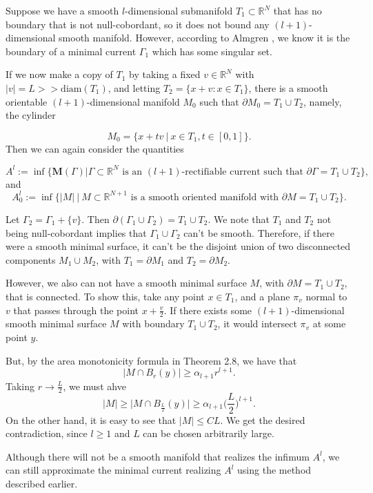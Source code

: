 \documentclass{amsart}
\numberwithin{equation}{section}
\theoremstyle{definition}
\theoremstyle{remark}
\newcommand{\R}{\mathbb{R}}
\begin{document}
Suppose we have a smooth $l$-dimensional submanifold $T_1\subset\R^N$ that has no boundary that is not null-cobordant, so it does not bound any $(l+1)$-dimensional smooth manifold. However, according to Almgren \cite{Almgren}, we know it 
{is} the boundary of a minimal current $\Gamma_1$ which has some singular set.

If we now make a copy of $T_1$ by taking a fixed $v \in \mathbb{R}^N$ with $|v| = L >> \text{diam}(T_1)$, and letting $T_2 = \{ x + v: x \in T_1 \}$, there  is a smooth orientable $(l+1)$-dimensional manifold $M_0$ such that $\partial M_0 = T_1 \cup T_2$, namely, the cylinder

\[ M_0 = \big\{ x+ tv\ \big|\  x \in T_1, t \in [0,1] \big\} .\]
Then we can again consider the quantities

\[ A^l := \inf \Big\{ \mathbf{M}(\Gamma)\big|\Gamma\subset\R^N \text{ is an } (l+1)\text{-rectifiable current such that } \partial \Gamma = T_1 \cup T_2 \Big\},\]
and
\[ A^l_0 := \inf \Big\{ |M|\ \big|\ M\subset\R^{N+1} \text{ is a } \text{smooth oriented manifold with } \partial M = T_1 \cup T_2 \Big\} .\]

Let $\Gamma_2 = \Gamma_1 + \{v\}$. Then $\partial (\Gamma_1 \cup \Gamma_2) = T_1 \cup T_2$. We note that $T_1$ and $T_2$ not being null-cobordant implies that $\Gamma_1 \cup \Gamma_2$ can't be smooth. Therefore, if there were a smooth minimal surface, it can't be the disjoint union of two disconnected components $M_1 \cup M_2$, with $T_1 = \partial M_1$ and $T_2 = \partial M_2$.

However, we also can not have a smooth minimal surface $M$, with $\partial M = T_1\cup T_2$,  that is connected. To show this, take any point $x \in T_1$, and a plane $\pi_v$ normal to $v$ that passes through the point $x +\frac{v}{2}$. If there exists some $(l+1)$-dimensional smooth minimal surface $M$ with boundary $T_1 \cup T_2$, it would intersect $\pi_v$ at some point $y $.

But, {by the area monotonicity formula in Theorem 2.8}, we have that
\[\big|M \cap B_r(y)\big| \geq \alpha_{l+1} r^{l+1}.\]
Taking $r \to \frac{L}2$, we must ahve
$$\big|M\big|\ge\big|M \cap B_{\frac{L}2}(y)\big|
\ge \alpha_{l+1} \big(\frac{L}{2}\big)^{l+1}.$$
On the other hand, it is easy to see that $\big|M\big|\le CL$. 
We get the desired contradiction, since $l\ge 1$ and $L$ can be chosen arbitrarily large.



 Although there will not be a smooth manifold that realizes the infimum $A^l$, we can still approximate the minimal current realizing $A^l$ using the method described earlier.
\end{document}
